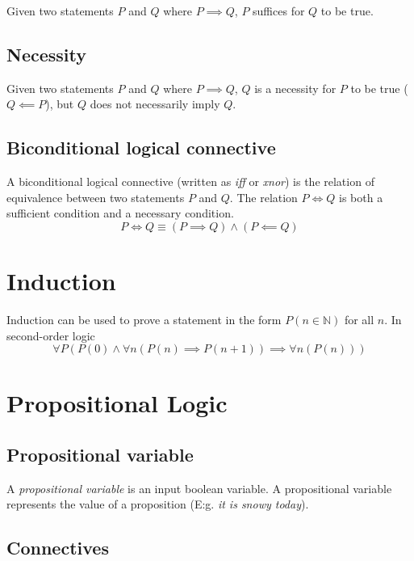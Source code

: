 \documentclass[a4paper]{article}
\begin{document}
Given two statements \(P\) and \(Q\) where \(P \implies Q\),
\(P\) suffices for \(Q\) to be true.

\subsection{Necessity}

Given two statements \(P\) and \(Q\) where \(P \implies Q\),
\(Q\) is a necessity for \(P\) to be true (\(Q \impliedby P\)), but
\(Q\) does not necessarily imply \(Q\).

\subsection{Biconditional logical connective}

A biconditional logical connective (written as \textit{iff} or \textit{xnor})
is the relation of equivalence
between two statements \(P\) and \(Q\).
The relation \(P \iff Q\) is both a sufficient condition and
a necessary condition.
\[
    P \iff Q
    \equiv
    (P \implies Q) \land (P \impliedby Q)
\]

\pagebreak

\section{Induction}

Induction can be used to prove a statement in the form \(P(n \in \mathbb{N})\)
for all \(n\). In second-order logic
\[
    \forall P \left(
        P(0) \land \forall n \left( P(n) \implies P(n+1) \right)
        \implies \forall n \left( P(n) \right)
    \right)
\]

\pagebreak

\section{Propositional Logic}

\subsection{Propositional variable}

A \textit{propositional variable} is an input boolean variable.
A propositional variable represents the value of a proposition (E:g. \textit{it is snowy today}).

\subsection{Connectives}
\end{document}
